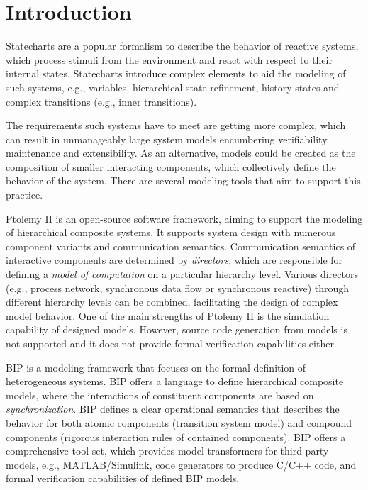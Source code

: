 \documentclass[conference]{IEEEtran}
\begin{document}
\section{Introduction}

Statecharts \cite{Harel:1987:SVF:34884.34886} are a popular formalism to describe the behavior of reactive systems, which process stimuli from the environment and react with respect to their internal states. Statecharts introduce complex elements to aid the modeling of such systems, e.g., variables, hierarchical state refinement, history states and complex transitions (e.g., inner transitions).

The requirements such systems have to meet are getting more complex, which can result in unmanageably large system models encumbering verifiability, maintenance and extensibility. As an alternative, models could be created as the composition of smaller interacting components,  which collectively define the behavior of the system. There are several modeling tools that aim to support this practice.


Ptolemy II \cite{ptolemy,ptolemy2} is an open-source software framework, aiming to support
the modeling of hierarchical composite systems. It supports system design with numerous component variants and communication semantics. Communication semantics of interactive components are determined by \emph{directors}, which are responsible for defining a \emph{model of computation} on a particular hierarchy level. Various directors (e.g., process network, synchronous data flow
or synchronous reactive) through different hierarchy levels can be combined, facilitating the design of complex model behavior. One of the main strengths of Ptolemy II is the simulation capability of designed models. However, source code generation from models is not supported and it does not provide formal verification capabilities either.

BIP \cite{bip,bip3} is a modeling framework that focuses on the formal definition of heterogeneous systems.
BIP offers a language to define hierarchical composite models, where the interactions of constituent components are based on \emph{synchronization}. BIP defines a clear operational semantics that describes the behavior for both atomic components (transition system model) and compound components (rigorous interaction rules of contained components). BIP offers a comprehensive tool set, which provides model transformers for third-party models, e.g., MATLAB/Simulink, code generators to produce C/C++ code, and formal
verification capabilities of defined BIP models.
\end{document}
